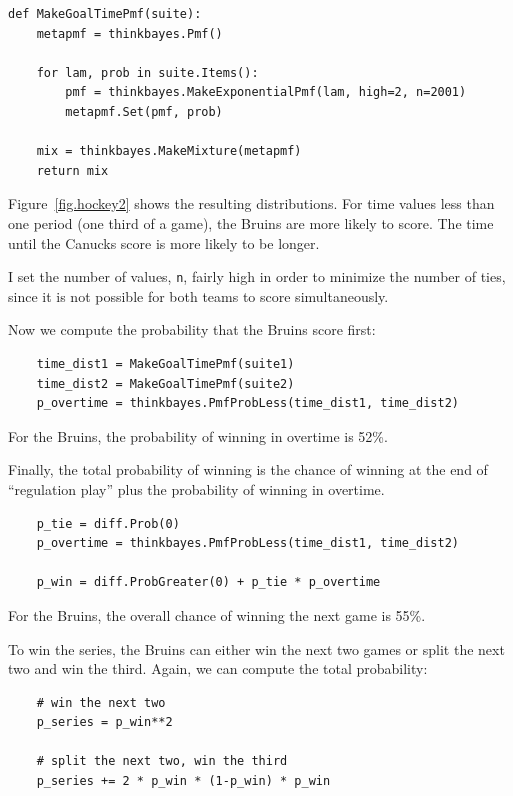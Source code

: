 \documentclass[12pt]{book}
\begin{document}
\begin{verbatim}
def MakeGoalTimePmf(suite):
    metapmf = thinkbayes.Pmf()

    for lam, prob in suite.Items():
        pmf = thinkbayes.MakeExponentialPmf(lam, high=2, n=2001)
        metapmf.Set(pmf, prob)

    mix = thinkbayes.MakeMixture(metapmf)
    return mix
\end{verbatim}  

Figure~\ref{fig.hockey2} shows the resulting distributions.  For
time values less than one period (one third of a game), the Bruins
are more likely to score.  The time until the Canucks score is
more likely to be longer.

I set the number of values, {\tt n}, fairly high in order to minimize
the number of ties, since it is not possible for both teams
to score simultaneously.

Now we compute the probability that the Bruins score first:

\begin{verbatim}
    time_dist1 = MakeGoalTimePmf(suite1)
    time_dist2 = MakeGoalTimePmf(suite2)
    p_overtime = thinkbayes.PmfProbLess(time_dist1, time_dist2)
\end{verbatim}  

For the Bruins, the probability of winning in overtime is 52\%.

Finally, the total probability of winning is the chance of
winning at the end of ``regulation play'' plus the probability
of winning in overtime.

\begin{verbatim}
    p_tie = diff.Prob(0)
    p_overtime = thinkbayes.PmfProbLess(time_dist1, time_dist2)

    p_win = diff.ProbGreater(0) + p_tie * p_overtime
\end{verbatim}  

For the Bruins, the overall chance of winning the next game is 55\%.

To win the series, the Bruins can either win the next two games
or split the next two and win the third.  Again, we can compute
the total probability:

\begin{verbatim}
    # win the next two
    p_series = p_win**2

    # split the next two, win the third
    p_series += 2 * p_win * (1-p_win) * p_win
\end{verbatim}  
\end{document}
